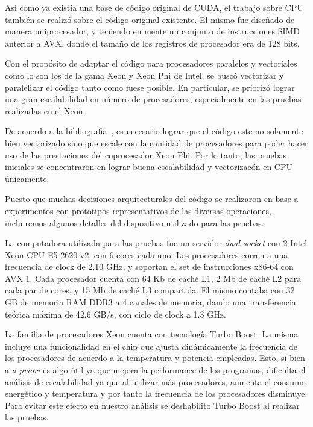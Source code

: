 
Asi como ya exist\'ia una base de c\'odigo original de CUDA, el
trabajo sobre CPU tambi\'en se realiz\'o sobre el c\'odigo original
existente. El mismo fue dise\~nado de manera uniprocesador, y teniendo
en mente un conjunto de instrucciones SIMD anterior a AVX, donde el tama\~no
de los registros de procesador era de 128 bits.

Con el prop\'osito de adaptar el c\'odigo para procesadores
paralelos y vectoriales como lo son los de la gama Xeon y Xeon Phi de
Intel, se busc\'o vectorizar y paralelizar el c\'odigo tanto como fuese
posible. En particular, se prioriz\'o lograr una gran escalabilidad en
n\'umero de procesadores, especialmente en las pruebas realizadas en el
Xeon.

De acuerdo a la bibliografia~\cite{Jeffers}, es necesario lograr que
el c\'odigo este no solamente bien vectorizado sino que escale con la
cantidad de procesadores para poder hacer uso de las prestaciones del
coprocesador Xeon Phi. Por lo tanto, las pruebas iniciales se concentraron
en lograr buena escalabilidad y vectorizac\'on en CPU \'unicamente.

Puesto que muchas decisiones arquitecturales del c\'odigo se realizaron en
base a experimentos con prototipos representativos de las diversas operaciones,
incluiremos algunos detalles del dispositivo utilizado para las pruebas.

La computadora utilizada para las pruebas fue un servidor \textit{dual-socket}
con 2 Intel Xeon CPU E5-2620 v2, con 6 cores cada uno. Los
procesadores corren a una frecuencia de clock de 2.10 GHz, y soportan el set
de instrucciones x86-64 con AVX 1.
Cada procesador cuenta con 64 Kb de cach\'e L1, 2 Mb de cach\'e L2 para cada par de cores, y
15 Mb de cach\'e L3 compartida.
El mismo contaba con 32 GB de memoria RAM DDR3 a 4 canales de memoria, dando
una transferencia te\'orica m\'axima de 42.6 GB/s, con ciclo de clock a 1.3 GHz.

La familia de procesadores Xeon cuenta con tecnolog\'ia Turbo Boost. La misma
incluye una funcionalidad en el chip que ajusta din\'amicamente la frecuencia
de los procesadores de acuerdo a la temperatura y potencia empleadas. Esto, si
bien a \textit{a priori} es algo \'util ya que mejora la performance de los
programas, dificulta el an\'alisis de escalabilidad ya que al utilizar m\'as
procesadores, aumenta el consumo energ\'etico y temperatura y por tanto la
frecuencia de los procesadores disminuye. Para evitar este efecto en nuestro
an\'alisis se deshabilito Turbo Boost al realizar las pruebas.

